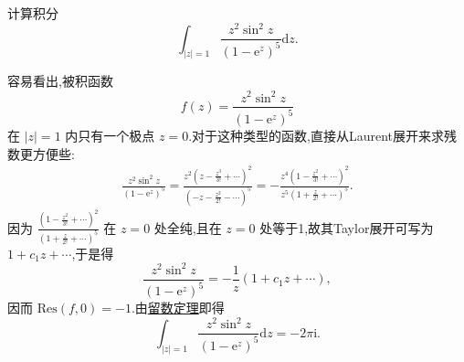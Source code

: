 \documentclass[../../main.tex]{subfiles}%
\begin{document}
\begin{example}
计算积分
\[
\int_{|z| = 1} \frac{z^2 \sin^2 z}{(1 - \mathrm{e}^z)^5} \mathrm{d}z.
\]
\end{example}
\begin{solution}
容易看出,被积函数
\[
f(z) = \frac{z^2 \sin^2 z}{(1 - \mathrm{e}^z)^5}
\]
在 \( |z| = 1 \) 内只有一个极点 \( z = 0 \).对于这种类型的函数,直接从Laurent展开来求残数更方便些:
\begin{align*}
\frac{z^2 \sin^2 z}{(1 - \mathrm{e}^z)^5} = \frac{z^2 \left( z - \frac{z^3}{3!} + \cdots \right)^2}{\left( -z - \frac{z^2}{2!} - \cdots \right)^5} = -\frac{z^4 \left( 1 - \frac{z^2}{3!} + \cdots \right)^2}{z^5 \left( 1 + \frac{z}{2!} + \cdots \right)^5}.
\end{align*}
因为 \( \frac{\left( 1 - \frac{z^2}{3!} + \cdots \right)^2}{\left( 1 + \frac{z}{2!} + \cdots \right)^5} \) 在 \( z = 0 \) 处全纯,且在 \( z = 0 \) 处等于1,故其Taylor展开可写为 \( 1 + c_1 z + \cdots \),于是得
\[
\frac{z^2 \sin^2 z}{(1 - \mathrm{e}^z)^5} = -\frac{1}{z} (1 + c_1 z + \cdots),
\]
因而 \( \mathrm{Res}(f, 0) = -1 \).由\hyperref[theorem:留数定理(残数定理)-定理5.4.9]{留数定理}即得
\[
\int_{|z| = 1} \frac{z^2 \sin^2 z}{(1 - \mathrm{e}^z)^5} \mathrm{d}z = -2\pi \mathrm{i}.
\]

\end{solution}
\end{document}
